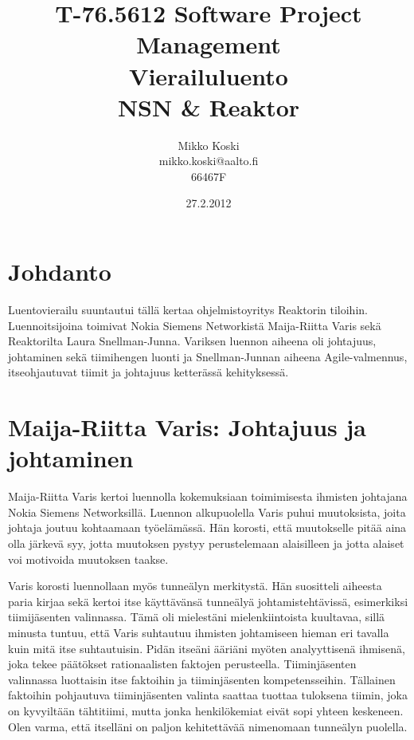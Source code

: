 \documentclass[a4paper]{article}
\begin{document}
\title{\small T-76.5612 Software Project Management \\ Vierailuluento \\ \huge NSN \& Reaktor}
\date{27.2.2012}
\author{Mikko Koski \\ mikko.koski@aalto.fi \\ 66467F}
\maketitle

\normalsize

\section{Johdanto}

Luentovierailu suuntautui tällä kertaa ohjelmistoyritys Reaktorin tiloihin. Luennoitsijoina toimivat Nokia Siemens Networkistä Maija-Riitta Varis sekä Reaktorilta Laura Snellman-Junna. Variksen luennon aiheena oli johtajuus, johtaminen sekä tiimihengen luonti ja Snellman-Junnan aiheena Agile-valmennus, itseohjautuvat tiimit ja johtajuus ketterässä kehityksessä.

\section{Maija-Riitta Varis: Johtajuus ja johtaminen}

Maija-Riitta Varis kertoi luennolla kokemuksiaan toimimisesta ihmisten johtajana Nokia Siemens Networksillä. Luennon alkupuolella Varis puhui muutoksista, joita johtaja joutuu kohtaamaan työelämässä. Hän korosti, että muutokselle pitää aina olla järkevä syy, jotta muutoksen pystyy perustelemaan alaisilleen ja jotta alaiset voi motivoida muutoksen taakse.

Varis korosti luennollaan myös tunneälyn merkitystä. Hän suositteli aiheesta paria kirjaa sekä kertoi itse käyttävänsä tunneälyä johtamistehtävissä, esimerkiksi tiimijäsenten valinnassa. Tämä oli mielestäni mielenkiintoista kuultavaa, sillä minusta tuntuu, että Varis suhtautuu ihmisten johtamiseen hieman eri tavalla kuin mitä itse suhtautuisin. Pidän itseäni ääriäni myöten analyyttisenä ihmisenä, joka tekee päätökset rationaalisten faktojen perusteella. Tiiminjäsenten valinnassa luottaisin itse faktoihin ja tiiminjäsenten kompetensseihin. Tällainen faktoihin pohjautuva tiiminjäsenten valinta saattaa tuottaa tuloksena tiimin, joka on kyvyiltään tähtitiimi, mutta jonka henkilökemiat eivät sopi yhteen keskeneen. Olen varma, että itselläni on paljon kehitettävää nimenomaan tunneälyn puolella.
\end{document}
